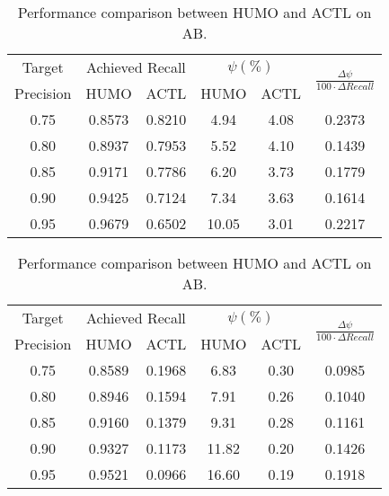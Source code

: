\begin{table}
\begin{minipage}[t]{0.5\textwidth}
\centering
\caption{Performance comparison between HUMO and ACTL on DS. }
\vspace{-0.1cm}
\label{tab:compare-act-ds}
\begin{tabular}{|c|c|c|c|c|c|}
\hline
Target & \multicolumn{2}{c|}{Achieved Recall} & \multicolumn{2}{c|}{$\psi (\%)$} & \multirow{2}{*}{$\frac{\Delta \psi}{100 \cdot \Delta Recall}$}\\
\cline{2-5}
Precision & HUMO & ACTL & HUMO & ACTL & \\
\hline
0.75 & 0.8573 & 0.8210 & 4.94 & 4.08 & 0.2373\\
0.80 & 0.8937 & 0.7953 & 5.52 & 4.10 & 0.1439\\
0.85 & 0.9171 & 0.7786 & 6.20 & 3.73 & 0.1779\\
0.90 & 0.9425 & 0.7124 & 7.34 & 3.63 & 0.1614\\
0.95 & 0.9679 & 0.6502 & 10.05 & 3.01 & 0.2217\\
\hline
\end{tabular}
\vspace{0.5cm}
\end{minipage}
\begin{minipage}[t]{0.5\textwidth}
\centering
\caption{Performance comparison between HUMO and ACTL on AB.}
\vspace{-0.1cm}
\label{tab:compare-act-ab}
\begin{tabular}{|c|c|c|c|c|c|}
\hline
Target & \multicolumn{2}{c|}{Achieved Recall} & \multicolumn{2}{c|}{$\psi (\%)$} & \multirow{2}{*}{$\frac{\Delta \psi}{100 \cdot \Delta Recall}$}\\
\cline{2-5}
Precision & HUMO & ACTL & HUMO & ACTL & \\
\hline
0.75 & 0.8589 & 0.1968 & 6.83 & 0.30 & 0.0985\\
0.80 & 0.8946 & 0.1594 & 7.91 & 0.26 & 0.1040\\
0.85 & 0.9160 & 0.1379 & 9.31 & 0.28 & 0.1161\\
0.90 & 0.9327 & 0.1173 & 11.82 & 0.20 & 0.1426\\
0.95 & 0.9521 & 0.0966 & 16.60 & 0.19 & 0.1918\\
\hline
\end{tabular}
\end{minipage}
\vspace{-0.5cm}
\end{table}

